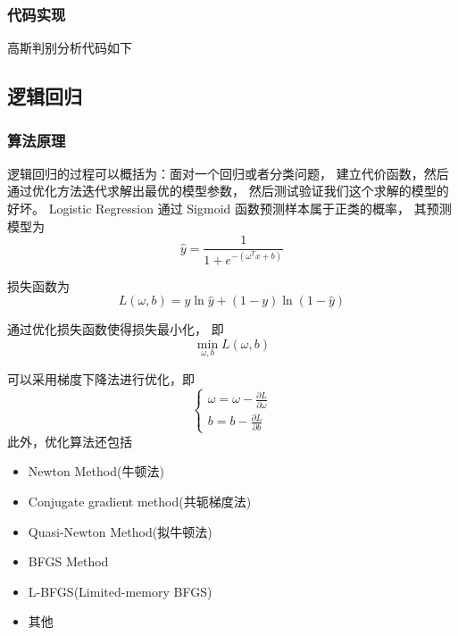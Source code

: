 \documentclass[cn,hazy,blue,14pt,normal]{elegantnote}
\begin{document}
\subsubsection{代码实现}
高斯判别分析代码如下

\subsection{逻辑回归}
\subsubsection{算法原理}
逻辑回归的过程可以概括为：面对一个回归或者分类问题，
建立代价函数，然后通过优化方法迭代求解出最优的模型参数，
然后测试验证我们这个求解的模型的好坏。
Logistic Regression 通过 Sigmoid 函数预测样本属于正类的概率，
其预测模型为
\begin{equation}
    \hat{y} = \frac{1}{1 + e^{ - (\omega^Tx + b)}}
\end{equation}

损失函数为
\begin{equation}
    L(\omega, b) = y \ln{\hat{y}} +(1 - y)\ln{(1 -\hat{y})}
\end{equation}

通过优化损失函数使得损失最小化， 即
\begin{equation}
    \min_{\omega, b} L(\omega, b)
\end{equation}

可以采用梯度下降法进行优化，即
\begin{equation}
    \begin{cases}
        \omega = \omega - \frac{\partial L}{\partial \omega} \\
        b = b- \frac{\partial L}{\partial b}
    \end{cases}
\end{equation}
此外，优化算法还包括
\begin{itemize}
    \item   Newton Method(牛顿法)
    \item Conjugate gradient method(共轭梯度法)
    \item Quasi-Newton Method(拟牛顿法)
    \item BFGS Method
    \item L-BFGS(Limited-memory BFGS)
    \item 其他
\end{itemize}
\end{document}

